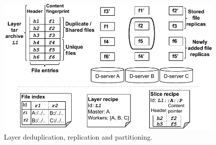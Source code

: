 \begin{figure}[t]
	\centering
	\centering
	\includegraphics[width=\columnwidth]{graphs/replication.pdf}
	\caption{Layer deduplication, replication and partitioning.}
	\label{fig:replication-partition}
\end{figure}